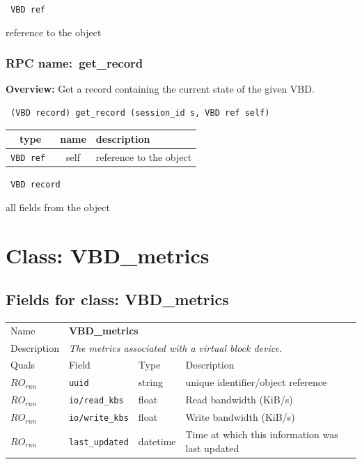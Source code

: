{\tt 
VBD ref
}


reference to the object
\vspace{0.3cm}
\vspace{0.3cm}
\vspace{0.3cm}
\subsubsection{RPC name:~get\_record}

{\bf Overview:} 
Get a record containing the current state of the given VBD.

\begin{verbatim} (VBD record) get_record (session_id s, VBD ref self)\end{verbatim}



 
\vspace{0.3cm}
\begin{tabular}{|c|c|p{7cm}|}
 \hline
{\bf type} & {\bf name} & {\bf description} \\ \hline
{\tt VBD ref } & self & reference to the object \\ \hline 

\end{tabular}

\vspace{0.3cm}

{\tt 
VBD record
}


all fields from the object
\vspace{0.3cm}
\vspace{0.3cm}
\vspace{0.3cm}

\vspace{1cm}
\newpage
\section{Class: VBD\_metrics}
\subsection{Fields for class: VBD\_metrics}
\begin{longtable}{|lllp{}|}
\hline
\multicolumn{1}{|l}{Name} & \multicolumn{3}{l|}{\bf VBD\_metrics} \\
\multicolumn{1}{|l}{Description} & \multicolumn{3}{l|}{\parbox{11cm}{\em
The metrics associated with a virtual block device.}} \\
\hline
Quals & Field & Type & Description \\
\hline
$\mathit{RO}_\mathit{run}$ &  {\tt uuid} & string & unique identifier/object reference \\
$\mathit{RO}_\mathit{run}$ &  {\tt io/read\_kbs} & float & Read bandwidth (KiB/s) \\
$\mathit{RO}_\mathit{run}$ &  {\tt io/write\_kbs} & float & Write bandwidth (KiB/s) \\
$\mathit{RO}_\mathit{run}$ &  {\tt last\_updated} & datetime & Time at which this information was last updated \\
\hline
\end{longtable}
